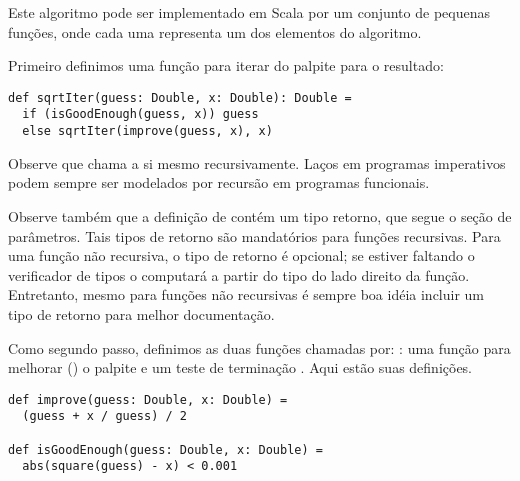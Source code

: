 
Este algoritmo pode ser implementado em Scala por um conjunto de pequenas fun\c{c}\~{o}es,
onde cada uma representa um dos elementos do algoritmo.

Primeiro definimos uma fun\c{c}\~{a}o para iterar do palpite para o resultado:


\begin{lstlisting}
def sqrtIter(guess: Double, x: Double): Double =
  if (isGoodEnough(guess, x)) guess
  else sqrtIter(improve(guess, x), x)
\end{lstlisting}

 
Observe que  chama a si mesmo recursivamente. La\c{c}os em 
programas imperativos podem sempre ser modelados por recurs\~{a}o em 
programas funcionais. 

Observe tamb\'{e}m que a defini\c{c}\~{a}o de  cont\'{e}m um tipo retorno,
que segue o se\c{c}\~{a}o de par\^{a}metros. Tais tipos de retorno s\~{a}o mandat\'{o}rios para 
fun\c{c}\~{o}es recursivas. Para uma fun\c{c}\~{a}o n\~{a}o recursiva, o tipo de retorno \'{e} opcional;
se estiver faltando o verificador de tipos o computar\'{a} a partir do tipo do lado
direito da fun\c{c}\~{a}o. Entretanto, mesmo para fun\c{c}\~{o}es n\~{a}o recursivas \'{e} sempre boa id\'{e}ia 
incluir um tipo de retorno para melhor documenta\c{c}\~{a}o.  


Como segundo passo, definimos as duas fun\c{c}\~{o}es chamadas por:
: uma fun\c{c}\~{a}o para melhorar () o palpite e um
teste de termina\c{c}\~{a}o . Aqui est\~{a}o suas defini\c{c}\~{o}es.
\begin{lstlisting}
def improve(guess: Double, x: Double) =
  (guess + x / guess) / 2    

def isGoodEnough(guess: Double, x: Double) =
  abs(square(guess) - x) < 0.001
\end{lstlisting}

